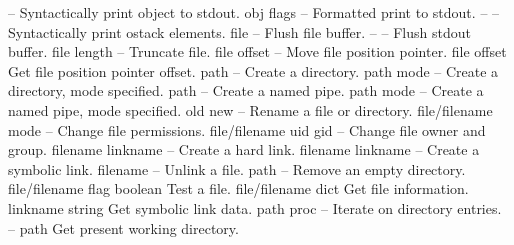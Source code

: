 \begin{longtable}{}
	{--}
	{Syntactically print object to stdout.}
\hline
\optableent
	{obj flags}
	{{\bf {}}}
	{--}
	{Formatted print to stdout.}
\hline
\optableent
	{--}
	{{\bf {}}}
	{--}
	{Syntactically print ostack elements.}
\hline
\optableent
	{file}
	{{\bf {}}}
	{--}
	{Flush file buffer.}
\hline
\optableent
	{--}
	{{\bf {}}}
	{--}
	{Flush stdout buffer.}
\hline
\optableent
	{file length}
	{{\bf {}}}
	{--}
	{Truncate file.}
\hline
\optableent
	{file offset}
	{{\bf {}}}
	{--}
	{Move file position pointer.}
\hline
\optableent
	{file}
	{{\bf {}}}
	{offset}
	{Get file position pointer offset.}
\hline
\optableent
	{path}
	{{\bf {}}}
	{--}
	{Create a directory.}
\optableent
	{path mode}
	{{\bf {}}}
	{--}
	{Create a directory, mode specified.}
\hline
\optableent
	{path}
	{{\bf {}}}
	{--}
	{Create a named pipe.}
\optableent
	{path mode}
	{{\bf {}}}
	{--}
	{Create a named pipe, mode specified.}
\hline
\optableent
	{old new}
	{{\bf {}}}
	{--}
	{Rename a file or directory.}
\hline
\optableent
	{file/filename mode}
	{{\bf {}}}
	{--}
	{Change file permissions.}
\hline
\optableent
	{file/filename uid gid}
	{{\bf {}}}
	{--}
	{Change file owner and group.}
\hline
\optableent
	{filename linkname}
	{{\bf {}}}
	{--}
	{Create a hard link.}
\hline
\optableent
	{filename linkname}
	{{\bf {}}}
	{--}
	{Create a symbolic link.}
\hline
\optableent
	{filename}
	{{\bf {}}}
	{--}
	{Unlink a file.}
\hline
\optableent
	{path}
	{{\bf {}}}
	{--}
	{Remove an empty directory.}
\hline
\optableent
	{file/filename flag}
	{{\bf {}}}
	{boolean}
	{Test a file.}
\hline
\optableent
	{file/filename}
	{{\bf {}}}
	{dict}
	{Get file information.}
\hline
\optableent
	{linkname}
	{{\bf {}}}
	{string}
	{Get symbolic link data.}
\hline
\optableent
	{path proc}
	{{\bf {}}}
	{--}
	{Iterate on directory entries.}
\hline
\optableent
	{--}
	{{\bf {}}}
	{path}
	{Get present working directory.}

\end{longtable}
